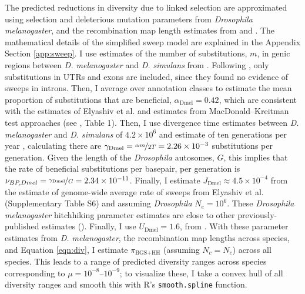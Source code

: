 \documentclass[9pt,lineno]{elife}
\begin{document}
The predicted reductions in diversity due to linked selection are approximated
using selection and deleterious mutation parameters from \emph{Drosophila
melanogaster}, and the recombination map length estimates from
\cite{Stapley2017-fs} and \cite{Corbett-Detig2015-gt}. The mathematical details
of the simplified sweep model are explained in the Appendix Section
\ref{app:sweep}. I use estimates of the number of substitutions, $m$, in genic
regions between \emph{D.  melanogaster} and \emph{D. simulans} from
\cite{Hu2013-pg}.  Following \cite{Elyashiv2016-vt}, only substitutions in UTRs
and exons are included, since they found no evidence of sweeps in introns.
Then, I average over annotation classes to estimate the mean proportion of
substitutions that are beneficial, $\alpha_\text{Dmel}=0.42$, which are
consistent with the estimates of Elyashiv et al. and estimates from
MacDonald--Kreitman test approaches (see \cite{Eyre-Walker2006-li}, Table 1).
Then, I use divergence time estimates between \emph{D. melanogaster} and
\emph{D. simulans} of $4.2 \times 10^6$ and estimate of ten generations per
year \citep{Obbard2012-on}, calculating there are $\gamma_\text{Dmel} =
\nicefrac{\alpha m}{2T} = 2.26 \times 10^{-3}$ substitutions per generation.
Given the length of the \emph{Drosophila} autosomes, $G$, this implies that the
rate of beneficial substitutions per basepair, per generation is $\nu_{BP,Dmel}
= \nicefrac{\gamma_\text{Dmel}}{G} = 2.34 \times 10^{-11}$. Finally, I estimate
$J_\text{Dmel} \approx 4.5 \times 10^{-4}$ from the estimate of genome-wide
average rate of sweeps from Elyashiv et al. (Supplementary Table S6) and
assuming \emph{Drosophila} $N_e = 10^6$. These \emph{Drosophila melanogaster}
hitchhiking parameter estimates are close to other previously-published
estimates (). Finally, I use $U_\text{Dmel}
= 1.6$, from \cite{Elyashiv2016-vt}. With these parameter estimates from
\emph{D.  melanogaster}, the recombination map lengths across species, and
Equation \eqref{eqn:div}, I estimate $\pi_\text{BGS+HH}$ (assuming $N_c=N_c$)
across all species. This leads to a range of predicted diversity ranges across
species corresponding to $\mu=10^{-8}$--$10^{-9}$; to visualize these, I take a
convex hull of all diversity ranges and smooth this with R's
\texttt{smooth.spline} function.


\end{document}
